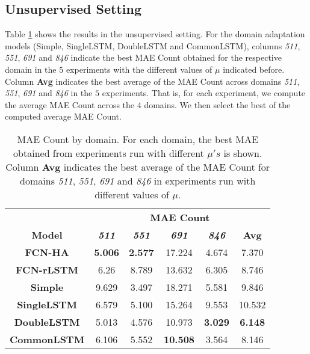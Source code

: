 \subsection{Unsupervised Setting}

Table \ref{table:webcamt_unsupervised_results} shows the results in the unsupervised setting. For the domain adaptation models (Simple, SingleLSTM, DoubleLSTM and CommonLSTM), columns \textit{511}, \textit{551}, \textit{691} and \textit{846} indicate the best MAE Count obtained for the respective domain in the $5$ experiments with the different values of $\mu$ indicated before. Column \textbf{Avg} indicates the best average of the MAE Count across domains \textit{511}, \textit{551}, \textit{691} and \textit{846} in the $5$ experiments. That is, for each experiment, we compute the average MAE Count across the $4$ domains. We then select the best of the computed average MAE Count.

\begin{table}[!ht]
	\centering
	\begin{tabular}{| c | c | c | c | c | c |}
		\cline{2-6}
		\multicolumn{1}{c|}{} & \multicolumn{5}{c|}{\textbf{MAE Count}} \\
		\cline{1-6}
		\textbf{Model} & \textbf{\textit{511}} & \textbf{\textit{551}} & \textbf{\textit{691}} & \textbf{\textit{846}} & \textbf{Avg}\\
		\hline
		\textbf{FCN-HA} & \textbf{5.006} & \textbf{2.577} & 17.224 & 4.674 & 7.370\\
		\hline
		\textbf{FCN-rLSTM} & 6.26 & 8.789 & 13.632 & 6.305 & 8.746\\
		\hline
		\textbf{Simple} & 9.629 & 3.497 & 18.271 & 5.581 & 9.846 \\
		\hline 
		\textbf{SingleLSTM} & 6.579 & 5.100 & 15.264  & 9.553 & 10.532 \\
		\hline
		\textbf{DoubleLSTM} & 5.013 & 4.576 & 10.973 & \textbf{3.029} & \textbf{6.148}\\
		\hline
		\textbf{CommonLSTM} & 6.106 & 5.552 & \textbf{10.508} & 3.564 & 8.146 \\
		\hline
	\end{tabular}
	\caption{MAE Count by domain. For each domain, the best MAE obtained from experiments run with different $\mu's$ is shown. Column \textbf{Avg} indicates the best average of the MAE Count for domains \textit{511}, \textit{551}, \textit{691} and \textit{846} in experiments run with different values of $\mu$.}
	\label{table:webcamt_unsupervised_results}
\end{table}


